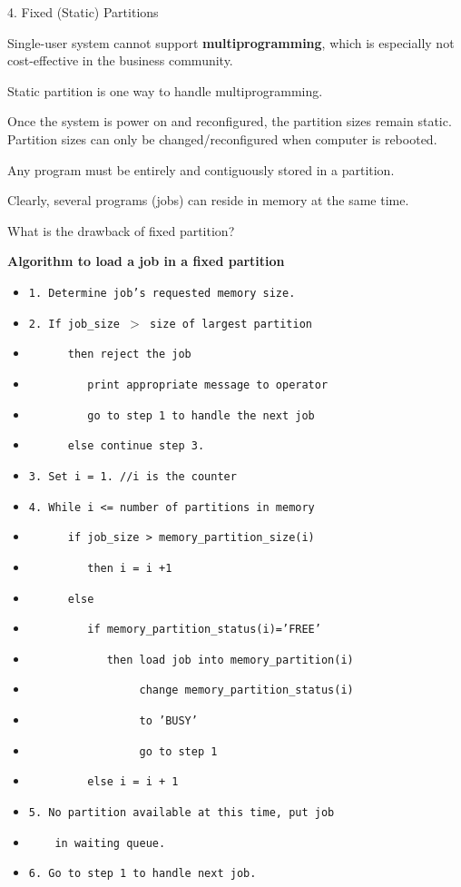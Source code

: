 \begin{slide}{ 4. Fixed (Static) Partitions}
\item Single-user system cannot support {\bf multiprogramming}, which is especially not cost-effective in the business community.
\item Static partition is one way to handle multiprogramming.
\item Once the system is power on and reconfigured, the partition sizes remain
static. Partition sizes can only be changed/reconfigured when computer is
rebooted.
\item Any program must be entirely and contiguously stored in a partition.
\item Clearly, several programs (jobs) can reside in memory at the same time.
\item What is the drawback of fixed partition?
\newpage
\item {\bf Algorithm to load a job in a fixed partition}
 \begin{itemize}
 \item {\tt 1. Determine job's requested memory size.}
 \item {\tt 2. If job\_size $>$ size of largest partition}
 \item {\tt ~~~~~~then reject the job}
 \item {\tt ~~~~~~~~~print appropriate message to operator}
 \item {\tt ~~~~~~~~~go to step 1 to handle the next job}
 \item {\tt ~~~~~~else continue step 3.}
 \item {\tt 3. Set i = 1. //i is the counter}
 \item {\tt 4. While i <= number of partitions in memory}
 \item {\tt ~~~~~~if job\_size > memory\_partition\_size(i)}
 \item {\tt ~~~~~~~~~then i = i +1}
 \item {\tt ~~~~~~else}
 \item {\tt ~~~~~~~~~if memory\_partition\_status(i)='FREE'}
 \item {\tt ~~~~~~~~~~~ then load job into memory\_partition(i)}
 \item {\tt ~~~~~~~~~~~~~~~~ change memory\_partition\_status(i)}
 \item {\tt ~~~~~~~~~~~~~~~~ to 'BUSY'}
 \item {\tt ~~~~~~~~~~~~~~~~ go to step 1}
 \item {\tt ~~~~~~~~~else i = i + 1}
 \item {\tt 5. No partition available at this time, put job}
 \item {\tt ~~~ in waiting queue.}
 \item {\tt 6. Go to step 1 to handle next job.}
 \end{itemize}
\end{slide}

